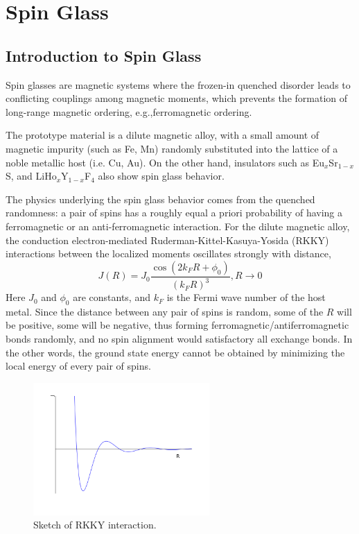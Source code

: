 \chapter{Spin Glass}
\label{chap:SGintro}
\section{Introduction to Spin Glass}
Spin glasses are magnetic systems where the frozen-in quenched  
disorder leads to conflicting couplings among magnetic moments, which prevents the formation 
of long-range magnetic ordering, e.g.,ferromagnetic ordering.

The prototype material is a dilute magnetic alloy, with a small amount of 
magnetic impurity (such as Fe, Mn) randomly substituted into the lattice of a 
noble metallic host (i.e. Cu, Au). On the other hand, insulators such as 
Eu$_x$Sr$_{1-x}$S, and LiHo$_{x}$Y$_{1-x}$F$_{4}$ also show spin glass behavior.
 

The physics underlying the spin glass behavior comes from the quenched 
randomness: a pair of spins has a roughly equal a priori probability of having
a ferromagnetic or an anti-ferromagnetic interaction. For the dilute magnetic 
alloy, the conduction electron-mediated 
Ruderman-Kittel-Kasuya-Yosida (RKKY) interactions between the localized moments
 oscillates strongly with distance, 
 \begin{equation}
   \label{eq:RKKY}
   J(R)=J_0\frac{\cos(2k_FR+\phi_0)}{(k_FR)^3}, R\rightarrow 0
 \end{equation}
Here $J_0$ and $\phi_0$ are constants, and $k_F$ is the Fermi wave number of the
host metal. Since the distance between any pair of spins is random, some of the $R$
will be positive, some will be negative,
thus forming ferromagnetic/antiferromagnetic bonds randomly, and no spin 
alignment would satisfactory all exchange bonds. In the other words, the 
ground state energy cannot be obtained by minimizing the local energy 
of every pair of spins.

\begin{figure}[!h]
  \label{fig:rkky}
  \centering
  \includegraphics[width=0.6\textwidth]{img/RKKY.png}
  \caption{Sketch of RKKY interaction.}
\end{figure}

